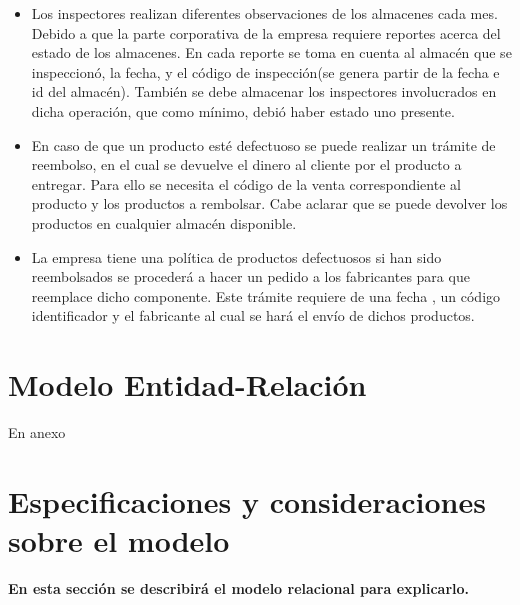 \documentclass[10pt, a4paper,openany]{report}
\begin{document}
\begin{itemize}
\begin{itemize}
	      \end{itemize}
	\item Los inspectores realizan diferentes observaciones de los almacenes cada mes. Debido a que la parte corporativa de la empresa requiere reportes acerca del estado de los almacenes. En cada reporte se toma en cuenta al almacén que se inspeccionó, la fecha, y el código de inspección(se genera partir de la fecha e id del almacén). También  se debe almacenar los inspectores involucrados en dicha operación, que como mínimo, debió haber estado uno presente.

	\item En caso de que un producto esté defectuoso se puede realizar un trámite de reembolso, en el cual se devuelve el dinero al cliente por el producto a entregar. Para ello se necesita el código de la venta correspondiente al producto y los productos a rembolsar. Cabe aclarar que se puede devolver los productos en cualquier almacén disponible.
	\item La empresa tiene una política de productos defectuosos si han sido reembolsados se procederá a hacer un pedido a los fabricantes para que reemplace dicho componente. Este trámite requiere de una fecha , un código identificador y el fabricante al cual se hará el envío de dichos productos.

\end{itemize}
\section{Modelo Entidad-Relación}
\label{sec:Modelo Entidad-Relación}

En anexo



\section{Especificaciones y consideraciones sobre el modelo}
\label{sec:Especificaciones y consideraciones sobre el modelo}

\noindent \textbf{En esta sección se describirá el modelo relacional para explicarlo.}
\end{document}
